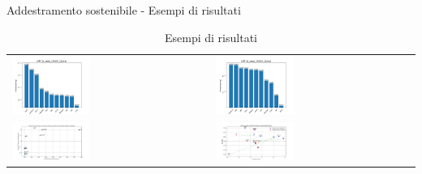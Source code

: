 \begin{frame}{Addestramento sostenibile - Esempi di risultati}
    \begin{table}[H]
        \centering
        \footnotesize
        \setlength\tabcolsep{20pt} %
        \setlength{\arrayrulewidth}{0.5pt}
        \begin{tabularx}{\textwidth}{X X}
            \includegraphics[width=0.4\textwidth, height=0.4\textheight, trim=0 0 0 0]{images/emissions_LFM-1b_artist_20U50I_25strat_earlyClassic.png} &
            \includegraphics[width=0.4\textwidth, height=0.4\textheight, trim=0 0 0 0]{images/emissions_LFM-1b_artist_20U50I_25strat_earlyModified.png} \\
            \includegraphics[width=0.4\textwidth, height=0.4\textheight, trim=0 0 0 0]{images/decrement_recall@10_LFM-1b_artist_20U50I_25strat.png} &
            \includegraphics[width=0.4\textwidth, height=0.4\textheight, trim=0 0 0 0]{images/recall@10_LFM-1b_artist_20U50I_25strat_comparison.png} \\

        \end{tabularx}
        \caption{Esempi di risultati}
    \end{table}
\end{frame}



